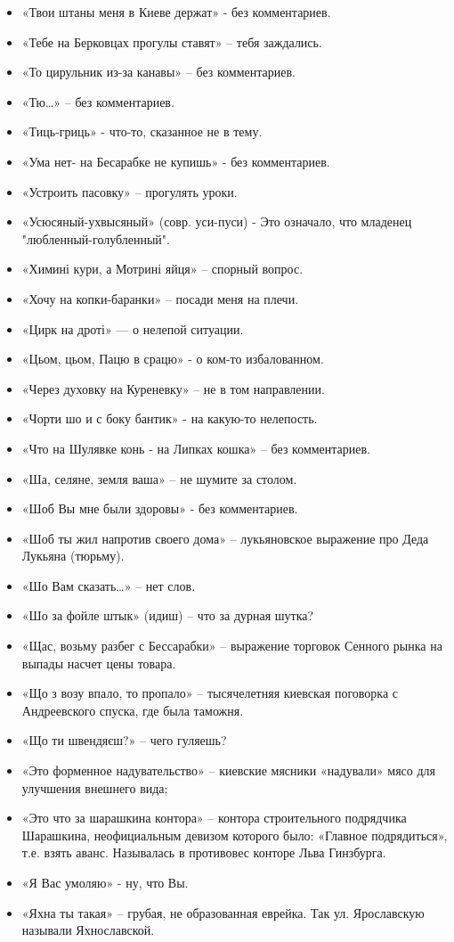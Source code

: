 \begin{itemize}
\item  «Твои штаны меня в Киеве держат» - без комментариев.
\item  «Тебе на Берковцах прогулы ставят» – тебя заждались.
\item  «То цирульник из-за канавы» – без комментариев.
\item  «Тю…» – без комментариев.
\item  «Тиць-гриць» - что-то, сказанное не в тему.
\item  «Ума нет- на Бесарабке не купишь» - без комментариев.
\item  «Устроить пасовку» – прогулять уроки.
\item  «Усюсяный-ухвысяный» (совр. уси-пуси) - Это означало, что младенец "любленный-голубленный".
\item  «Химині кури, а Мотрині яйця» – спорный вопрос.
\item  «Хочу на копки-баранки» – посади меня на плечи.
\item  «Цирк на дроті» — о нелепой ситуации.
\item  «Цьом, цьом, Пацю в срацю»  - о ком-то избалованном.
\item  «Через духовку на Куреневку» – не в том направлении.
\item  «Чорти шо и с боку бантик» - на какую-то нелепость.
\item  «Что на Шулявке конь - на Липках кошка» – без комментариев.
\item  «Ша, селяне, земля ваша» – не шумите за столом.
\item  «Шоб Вы мне были здоровы» - без комментариев.
\item  «Шоб ты жил напротив своего дома» – лукьяновское выражение про Деда Лукьяна (тюрьму).
\item  «Шо Вам сказать…» – нет слов.
\item  «Шо за фойле штык» (идиш) – что за дурная шутка?
\item  «Щас, возьму разбег с Бессарабки» – выражение торговок Сенного рынка на выпады насчет цены товара.
\item  «Що з возу впало, то пропало» – тысячелетняя киевская поговорка с Андреевского спуска, где была таможня.
\item  «Що ти швендяєш?» – чего гуляешь?
\item  «Это форменное надувательство» – киевские мясники «надували» мясо для улучшения внешнего вида;
\item  «Это что за шарашкина контора» – контора строительного подрядчика Шарашкина, неофициальным девизом которого было: «Главное подрядиться», т.е. взять аванс. Называлась в противовес конторе Льва Гинзбурга.
\item  «Я Вас умоляю» -  ну, что Вы.
\item  «Яхна ты такая» – грубая, не образованная еврейка. Так ул. Ярославскую называли Яхнославской.

\end{itemize}
